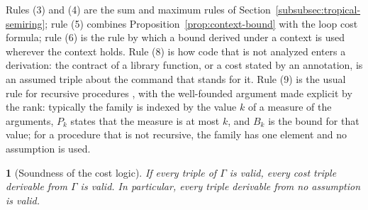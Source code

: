 \documentclass[oneside,english]{amsart}
\numberwithin{equation}{section}
\numberwithin{figure}{section}
\theoremstyle{plain}
\newtheorem{thm}{\protect\theoremname}
\theoremstyle{definition}
\theoremstyle{plain}
\theoremstyle{remark}
\theoremstyle{plain}
\theoremstyle{definition}
\theoremstyle{plain}
\theoremstyle{remark}
\providecommand{\theoremname}{Theorem}
\begin{document}
Rules (3) and (4) are the sum and maximum rules of Section~\ref{subsubsec:tropical-semiring}; rule (5) combines Proposition~\ref{prop:context-bound} with the loop cost formula; rule (6) is the rule by which a bound derived under a context is used wherever the context holds. Rule (8) is how code that is not analyzed enters a derivation: the contract of a library function, or a cost stated by an annotation, is an assumed triple about the command that stands for it. Rule (9) is the usual rule for recursive procedures \cite{nipkow2002hoare}, with the well-founded argument made explicit by the rank: typically the family is indexed by the value $k$ of a measure of the arguments, $P_k$ states that the measure is at most $k$, and $B_k$ is the bound for that value; for a procedure that is not recursive, the family has one element and no assumption is used.

\begin{thm}[Soundness of the cost logic]
\label{thm:cost-logic-soundness}
If every triple of $\Gamma$ is valid, every cost triple derivable from $\Gamma$ is valid. In particular, every triple derivable from no assumption is valid.
\end{thm}
\end{document}
